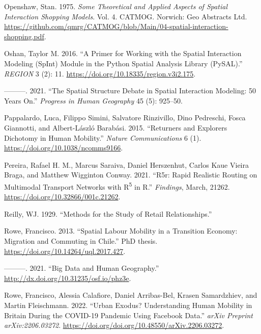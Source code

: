 \documentclass[11pt,letterpaper]{article}
\newlength{\cslhangindent}
\newlength{\cslentryspacingunit} %
\newenvironment{CSLReferences}[2] %
 {%
  \setlength{\parindent}{0pt}
  \ifodd #1
  \let\oldpar\par
  \def\par{\hangindent=\cslhangindent\oldpar}
  \fi
  \setlength{\parskip}{#2\cslentryspacingunit}
 }%
 {}
\begin{document}
\begin{CSLReferences}{1}{0}
\leavevmode{}%
Openshaw, Stan. 1975. \emph{Some {Theoretical} and {Applied} {Aspects} of {Spatial} {Interaction} {Shopping} {Models}}. Vol. 4. {CATMOG}. Norwich: Geo Abstracts Ltd. \url{https://github.com/qmrg/CATMOG/blob/Main/04-spatial-interaction-shopping.pdf}.

\leavevmode{}%
Oshan, Taylor M. 2016. {``A Primer for Working with the Spatial Interaction Modeling (SpInt) Module in the Python Spatial Analysis Library (PySAL).''} \emph{REGION} 3 (2): 11. \url{https://doi.org/10.18335/region.v3i2.175}.

\leavevmode{}%
---------. 2021. {``The Spatial Structure Debate in Spatial Interaction Modeling: 50 Years On.''} \emph{Progress in Human Geography} 45 (5): 925--50.

\leavevmode{}%
Pappalardo, Luca, Filippo Simini, Salvatore Rinzivillo, Dino Pedreschi, Fosca Giannotti, and Albert-László Barabási. 2015. {``Returners and Explorers Dichotomy in Human Mobility.''} \emph{Nature Communications} 6 (1). \url{https://doi.org/10.1038/ncomms9166}.

\leavevmode{}%
Pereira, Rafael H. M., Marcus Saraiva, Daniel Herszenhut, Carlos Kaue Vieira Braga, and Matthew Wigginton Conway. 2021. {``R5r: Rapid Realistic Routing on Multimodal Transport Networks with R{\textsuperscript{5}} in R.''} \emph{Findings}, March, 21262. \url{https://doi.org/10.32866/001c.21262}.

\leavevmode{}%
Reilly, WJ. 1929. {``Methods for the Study of Retail Relationships.''}

\leavevmode{}%
Rowe, Francisco. 2013. {``Spatial Labour Mobility in a Transition Economy: Migration and Commuting in Chile.''} PhD thesis. \url{https://doi.org/10.14264/uql.2017.427}.

\leavevmode{}%
---------. 2021. {``Big Data and Human Geography.''} \url{http://dx.doi.org/10.31235/osf.io/phz3e}.

\leavevmode{}%
Rowe, Francisco, Alessia Calafiore, Daniel Arribas-Bel, Krasen Samardzhiev, and Martin Fleischmann. 2022. {``Urban Exodus? Understanding Human Mobility in Britain During the COVID-19 Pandemic Using Facebook Data.''} \emph{arXiv Preprint arXiv:2206.03272}. \url{https://doi.org/doi.org/10.48550/arXiv.2206.03272}.


\end{CSLReferences}
\end{document}
